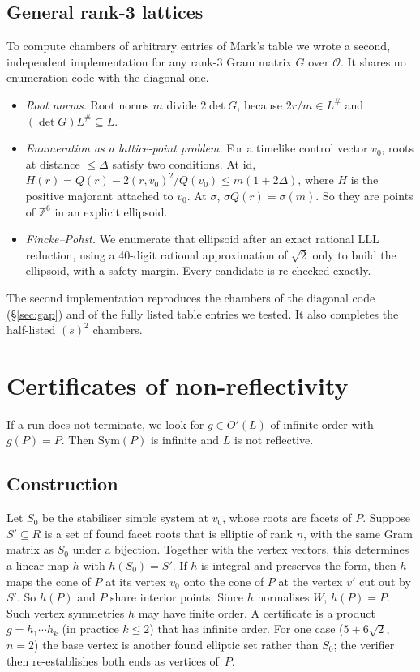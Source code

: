 \documentclass[11pt]{amsart}
\theoremstyle{definition}
\newcommand{\Z}{\mathbb{Z}}
\newcommand{\OK}{\mathcal{O}}
\newcommand{\id}{\mathrm{id}}
\begin{document}
\subsection{General rank-3 lattices}\label{sec:vinberg3}
To compute chambers of arbitrary entries of Mark's table we wrote a second, independent
implementation for any rank-3 Gram matrix $G$ over $\OK$. It shares no enumeration code with
the diagonal one.
\begin{itemize}
\item \emph{Root norms.} Root norms $m$ divide $2\det G$, because $2r/m\in L^\#$ and
  $(\det G)L^\#\subseteq L$.
\item \emph{Enumeration as a lattice-point problem.} For a timelike control vector $v_0$,
  roots at distance $\le\Delta$ satisfy two conditions. At $\id$,
  $H(r)=Q(r)-2(r,v_0)^2/Q(v_0)\le m(1+2\Delta)$, where $H$ is the positive majorant
  attached to $v_0$. At $\sigma$, $\sigma Q(r)=\sigma(m)$. So they are points of $\Z^6$ in
  an explicit ellipsoid.
\item \emph{Fincke--Pohst.} We enumerate that ellipsoid after an exact rational LLL reduction,
  using a 40-digit rational approximation of $\sqrt2$ only to build the ellipsoid, with a
  safety margin. Every candidate is re-checked exactly.
\end{itemize}
The second implementation reproduces the chambers of the diagonal code (\S\ref{sec:gap}) and
of the fully listed table entries we tested. It also completes the half-listed $(s)^2$
chambers.

\section{Certificates of non-reflectivity}\label{sec:certificates}

If a run does not terminate, we look for $g\in O'(L)$ of infinite order with $g(P)=P$. Then
$\mathrm{Sym}(P)$ is infinite and $L$ is not reflective.

\subsection{Construction}
Let $S_0$ be the stabiliser simple system at $v_0$, whose roots are facets of $P$. Suppose
$S'\subseteq R$ is a set of found facet roots that is elliptic of rank $n$, with the same
Gram matrix as $S_0$ under a bijection. Together with the vertex vectors, this determines a
linear map $h$ with $h(S_0)=S'$. If $h$ is integral and preserves the form, then $h$ maps the
cone of $P$ at its vertex $v_0$ onto the cone of $P$ at the vertex $v'$ cut out by $S'$. So
$h(P)$ and $P$ share interior points. Since $h$ normalises $W$, $h(P)=P$. Such vertex
symmetries $h$ may have finite order. A certificate is a product $g=h_1\cdots h_k$ (in
practice $k\le2$) that has infinite order. For one case ($5+6\sqrt2$, $n=2$) the base vertex
is another found elliptic set rather than $S_0$; the verifier then re-establishes both ends as
vertices of~$P$.
\end{document}
